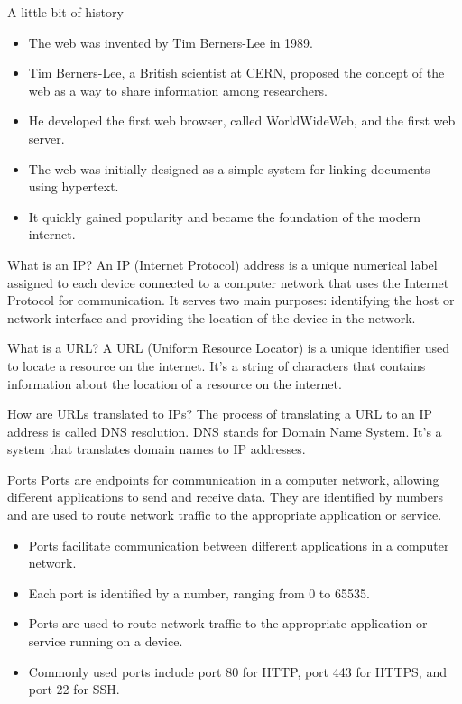 \documentclass{beamer}
\begin{document}
\begin{frame}{A little bit of history}
    \begin{itemize}
        \item The web was invented by Tim Berners-Lee in 1989.
        \item Tim Berners-Lee, a British scientist at CERN, proposed the concept of the web as a way to share information among researchers.
        \item He developed the first web browser, called WorldWideWeb, and the first web server.
        \item The web was initially designed as a simple system for linking documents using hypertext.
        \item It quickly gained popularity and became the foundation of the modern internet.
    \end{itemize}
\end{frame}

\begin{frame}{What is an IP?}
    An IP (Internet Protocol) address is a unique numerical label assigned to each device connected to a computer network that uses the Internet Protocol for communication.
    It serves two main purposes: identifying the host or network interface and providing the location of the device in the network.
\end{frame}

\begin{frame}{What is a URL?}
    A URL (Uniform Resource Locator) is a unique identifier used to locate a resource on the internet. It's a string of characters that contains information about the location of a resource on the internet.
\end{frame}

\begin{frame}{How are URLs translated to IPs?}
    The process of translating a URL to an IP address is called DNS resolution. DNS stands for Domain Name System. It's a system that translates domain names to IP addresses.
\end{frame}

\begin{frame}{Ports}
    Ports are endpoints for communication in a computer network, allowing different applications to send and receive data.
    They are identified by numbers and are used to route network traffic to the appropriate application or service.
    \begin{itemize}
        \item Ports facilitate communication between different applications in a computer network.
        \item Each port is identified by a number, ranging from 0 to 65535.
        \item Ports are used to route network traffic to the appropriate application or service running on a device.
        \item Commonly used ports include port 80 for HTTP, port 443 for HTTPS, and port 22 for SSH.
    \end{itemize}
\end{frame}
\end{document}

